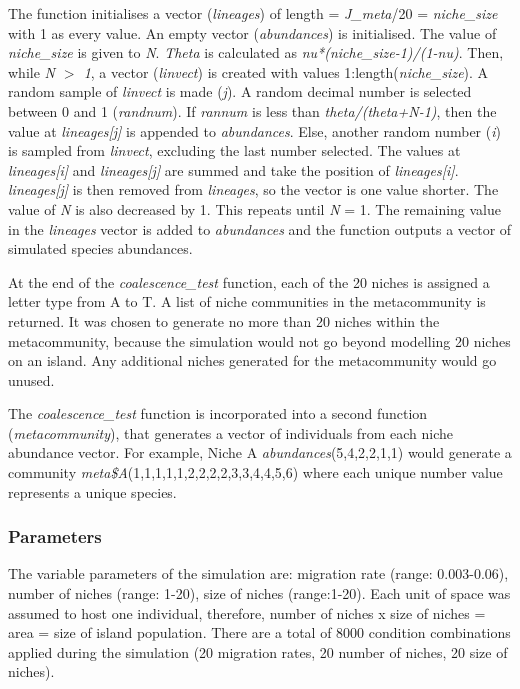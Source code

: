 \noindent The function initialises a vector (\textit{lineages}) of length = \textit{J\_meta}/20 = \textit{niche\_size} with 1 as every value. An empty vector (\textit{abundances}) is initialised. The value of \textit{niche\_size} is given to \textit{N}. \textit{Theta} is calculated as \textit{nu*(niche\_size-1)/(1-nu)}. Then, while \textit{N $>$ 1}, a vector (\textit{linvect}) is created with values 1:length(\textit{niche\_size}). A random sample of \textit{linvect} is made (\textit{j}). A random decimal number is selected between 0 and 1 (\textit{randnum}). If \textit{rannum} is less than \textit{theta/(theta+N-1)}, then the value at \textit{lineages[j]} is appended to \textit{abundances}. Else, another random number (\textit{i}) is sampled from \textit{linvect}, excluding the last number selected. The values at \textit{lineages[i]} and \textit{lineages[j]} are summed and take the position of \textit{lineages[i]}. \textit{lineages[j]} is then removed from \textit{lineages}, so the vector is one value shorter. The value of \textit{N} is also decreased by 1. This repeats until \textit{N} = 1. The remaining value in the \textit{lineages} vector is added to \textit{abundances} and the function outputs a vector of simulated species abundances.\bigskip

\noindent At the end of the \textit{coalescence\_test} function, each of the 20 niches is assigned a letter type from A to T. A list of niche communities in the metacommunity is returned. It was chosen to generate no more than 20 niches within the metacommunity, because the simulation would not go beyond modelling 20 niches on an island. Any additional niches generated for the metacommunity would go unused. \bigskip

\noindent The \textit{coalescence\_test} function is incorporated into a second function (\textit{metacommunity}), that generates a vector of individuals from each niche abundance vector. For example, Niche A \textit{abundances}(5,4,2,2,1,1) would generate a community \textit{meta\$A}(1,1,1,1,1,2,2,2,2,3,3,4,4,5,6) where each unique number value represents a unique species.%

\subsubsection{Parameters}
The variable parameters of the simulation are: migration rate (range: 0.003-0.06), number of niches (range: 1-20), size of niches (range:1-20). Each unit of space was assumed to host one individual, therefore, number of niches x size of niches = area = size of island population. There are a total of 8000 condition combinations applied during the simulation (20 migration rates, 20 number of niches, 20 size of niches). 

